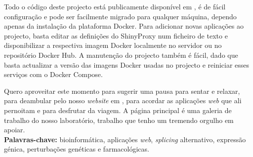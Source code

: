 Todo o código deste projecto está publicamente disponível em , é de fácil configuração e pode ser facilmente migrado para qualquer máquina, dependo apenas da instalação da plataforma Docker. Para adicionar novas aplicações ao projecto, basta editar as definições do ShinyProxy num ficheiro de texto e disponibilizar a respectiva imagem Docker localmente no servidor ou no repositório Docker Hub. A manutenção do projecto também é fácil, dado que basta actualizar a versão das imagens Docker usadas no projecto e reiniciar esses serviços com o Docker Compose.

Quero aproveitar este momento para sugerir uma pausa para sentar e relaxar, para deambular pelo nosso \emph{website} em , para acordar as aplicações \emph{web} que ali pernoitam e para desfrutar da viagem. A página principal é uma galeria de trabalho do nosso laboratório, trabalho que tenho um tremendo orgulho em apoiar.\\

\textbf{Palavras-chave:} bioinformática, aplicações \emph{web}, \emph{splicing} alternativo, expressão génica, perturbações genéticas e farmacológicas.

